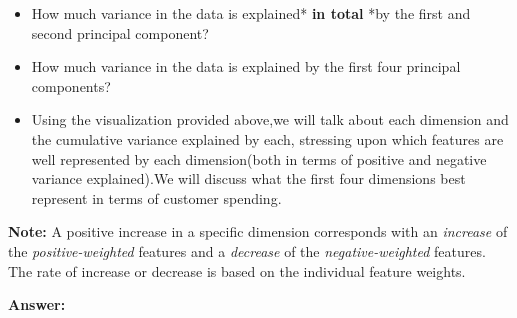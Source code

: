 \documentclass[11pt]{article}
\providecommand{\tightlist}{%
      \setlength{\itemsep}{0pt}\setlength{\parskip}{0pt}}
\begin{document}
\begin{itemize}
\tightlist
\item
  How much variance in the data is explained* \textbf{in total} *by the
  first and second principal component?
\item
  How much variance in the data is explained by the first four principal
  components?
\item
  Using the visualization provided above,we will talk about each
  dimension and the cumulative variance explained by each, stressing
  upon which features are well represented by each dimension(both in
  terms of positive and negative variance explained).We will discuss
  what the first four dimensions best represent in terms of customer
  spending.
\end{itemize}

\textbf{Note:} A positive increase in a specific dimension corresponds
with an \emph{increase} of the \emph{positive-weighted} features and a
\emph{decrease} of the \emph{negative-weighted} features. The rate of
increase or decrease is based on the individual feature weights.

    \textbf{Answer:}
\end{document}
